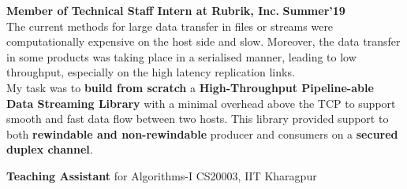 \documentclass[10pt]{article}
\begin{document}
\vspace{-1.5ex}
\spacedhrule{0.15ex}{1.0ex}
\large {\textbf{Member of Technical Staff Intern at Rubrik, Inc.}} \normalsize
\href{https://github.com/shmundhra/Credentials/tree/master/Internships} {\hspace{0.5ex}\faMousePointer}
{\hfill} \textbf{Summer'19}\\[0.1em]%
The current methods for large data transfer in files or streams were computationally expensive on the host side and slow. Moreover, the data transfer in some products was taking place in a serialised manner, leading to low throughput, especially on the high latency replication links.\\
My task was to \textbf{build from scratch} a \textbf{High-Throughput Pipeline-able Data Streaming Library} with a minimal overhead above the TCP to support smooth and fast data flow between two hosts. This library provided support to both \textbf{rewindable and non-rewindable} producer and consumers on a \textbf{secured duplex channel}.
\iffalse
\begin{itemize}
\item Designed a High Throughput Streaming Library for data transfer over a \textbf{Secured TCP Connection} as an API to user.\\[-1.9em]
\item Implemented a \textbf{duplex server-client stream} where each end can be a rewindable/non-rewindable   producer/consumer.\\[-1.9em]
\item \textbf{Designed} the response, request and error packet \textbf{headers} and the \textbf{protocol} to be followed from scratch.\\[-1.9em]
\item Used \textbf{thread-per-connection concurrency control} mechanism and maintained synchronisation between threads using \textbf{mutex lock wrappers} to avoid the producer-consumer and stream registration race conditions.\\[-2em]
\end{itemize}
\fi
\vspace{-0.5ex}
\spacedhrule{0.15ex}{1.0ex}
\large { \textbf{Teaching Assistant} for Algorithms-I CS20003, IIT Kharagpur} \normalsize
\end{document}
